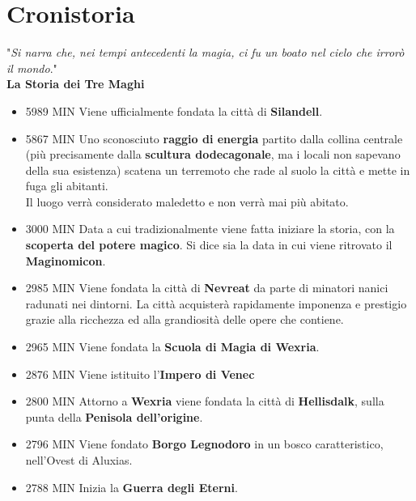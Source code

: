 \documentclass[10pt,twoside,onecolumn,openany]{book}
\begin{document}
\chapter{Cronistoria}
\begin{quotebox}
	"\textit{Si narra che, nei tempi antecedenti la magia, ci fu un boato nel cielo che irrorò il mondo}."\\ \textbf{La Storia dei Tre Maghi}
\end{quotebox}
\begin{multicols}{2}
\begin{itemize}
\itemsep-1em
\item 5989 MIN Viene ufficialmente fondata la città di \textbf{Silandell}.\\
\item 5867 MIN Uno sconosciuto \textbf{raggio di energia} partito dalla collina centrale (più precisamente dalla \textbf{scultura dodecagonale}, ma i locali non sapevano della sua esistenza) scatena un terremoto che rade al suolo la città e mette in fuga gli abitanti.\\
Il luogo verrà considerato maledetto e non verrà mai più abitato.\\
\item 3000 MIN Data a cui tradizionalmente viene fatta iniziare la storia, con la \textbf{scoperta del potere magico}. Si dice sia la data in cui viene ritrovato il \textbf{Maginomicon}.\\
\item 2985 MIN Viene fondata la città di \textbf{Nevreat} da parte di minatori nanici radunati nei dintorni. La città acquisterà rapidamente imponenza e prestigio grazie alla ricchezza ed alla grandiosità delle opere che contiene.\\
\item 2965 MIN Viene fondata la \textbf{Scuola di Magia di Wexria}.\\
\item 2876 MIN Viene istituito l'\textbf{Impero di Venec}\\
\item 2800 MIN Attorno a \textbf{Wexria} viene fondata la città di \textbf{Hellisdalk}, sulla punta della \textbf{Penisola dell'origine}.\\
\item 2796 MIN Viene fondato \textbf{Borgo Legnodoro} in un bosco caratteristico, nell'Ovest di Aluxias.\\
\item 2788 MIN Inizia la \textbf{Guerra degli Eterni}.\\

\end{itemize}
\end{multicols}
\end{document}
